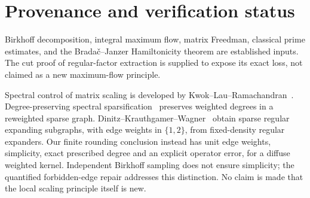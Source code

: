 \documentclass[11pt]{article}
\theoremstyle{remark}
\begin{document}
\section{Provenance and verification status}
Birkhoff decomposition, integral maximum flow, matrix Freedman,
classical prime estimates, and the Brada\v{c}--Janzer
Hamiltonicity theorem are established inputs.
The cut proof of regular-factor extraction is supplied to expose
its exact loss, not claimed as a new maximum-flow principle.

Spectral control of matrix scaling is developed by
Kwok--Lau--Ramachandran~\cite{KLR}.
Degree-preserving spectral sparsification~\cite{CGPSS}
preserves weighted degrees in a reweighted sparse graph.
Dinitz--Krauthgamer--Wagner~\cite{DKW} obtain sparse regular
expanding subgraphs, with edge weights in \(\{1,2\}\),
from fixed-density regular expanders.
Our finite rounding conclusion instead has unit edge weights,
simplicity, exact prescribed degree and an explicit operator
error, for a diffuse weighted kernel.
Independent Birkhoff sampling does not ensure simplicity;
the quantified forbidden-edge repair addresses this distinction.
No claim is made that the local scaling principle itself is new.
\end{document}
